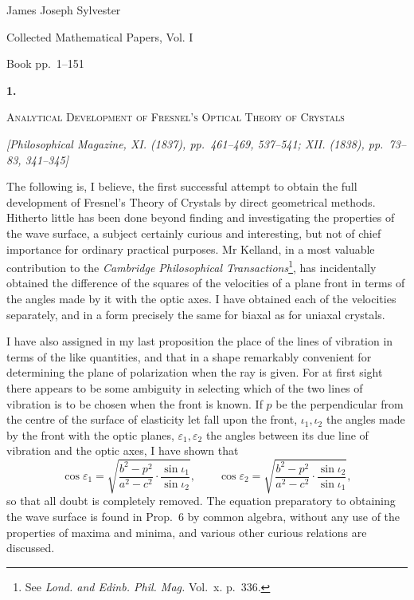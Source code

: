 \documentclass[11pt]{article}
\newcommand{\paperhead}[3]{%
  \clearpage
  \begin{center}
  {\Large\bfseries #1.}\par\vspace{0.85em}
  {\large\scshape #2}\par\vspace{0.6em}
  {\itshape [#3]}\par
  \end{center}\vspace{0.4em}}
\newcommand{\sourcepage}[1]{\marginpar{\scriptsize p.~#1}}
\begin{document}
\begin{center}
{\Large James Joseph Sylvester}\par\vspace{0.25em}
{\large Collected Mathematical Papers, Vol. I}\par\vspace{0.25em}
{\normalsize Book pp.~1--151}\par
\end{center}
\thispagestyle{empty}
\vspace{0.75em}

\paperhead{1}{Analytical Development of Fresnel's Optical Theory of Crystals}{Philosophical Magazine, XI. (1837), pp.~461--469, 537--541; XII. (1838), pp.~73--83, 341--345}

\sourcepage{1}
The following is, I believe, the first successful attempt to obtain the full development of Fresnel's Theory of Crystals by direct geometrical methods. Hitherto little has been done beyond finding and investigating the properties of the wave surface, a subject certainly curious and interesting, but not of chief importance for ordinary practical purposes. Mr Kelland, in a most valuable contribution to the \emph{Cambridge Philosophical Transactions}\footnote{See \emph{Lond. and Edinb. Phil. Mag.} Vol.~x. p.~336.}, has incidentally obtained the difference of the squares of the velocities of a plane front in terms of the angles made by it with the optic axes. I have obtained each of the velocities separately, and in a form precisely the same for biaxal as for uniaxal crystals.

I have also assigned in my last proposition the place of the lines of vibration in terms of the like quantities, and that in a shape remarkably convenient for determining the plane of polarization when the ray is given. For at first sight there appears to be some ambiguity in selecting which of the two lines of vibration is to be chosen when the front is known. If $p$ be the perpendicular from the centre of the surface of elasticity let fall upon the front, $\iota_1,\iota_2$ the angles made by the front with the optic planes, $\varepsilon_1,\varepsilon_2$ the angles between its due line of vibration and the optic axes, I have shown that
\[
\cos \varepsilon_1=
\sqrt{\frac{b^2-p^2}{a^2-c^2}\cdot\frac{\sin\iota_1}{\sin\iota_2}},
\qquad
\cos \varepsilon_2=
\sqrt{\frac{b^2-p^2}{a^2-c^2}\cdot\frac{\sin\iota_2}{\sin\iota_1}},
\]
so that all doubt is completely removed. The equation preparatory to obtaining the wave surface is found in Prop.~6 by common algebra, without any use of the properties of maxima and minima, and various other curious relations are discussed.
\end{document}
